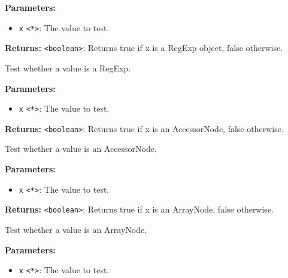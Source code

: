 \documentclass[12pt,a4paper]{article}
\begin{document}
\noindent \textbf{Parameters:}
\begin{itemize}
  \item \texttt{x} \texttt{<*>}: The value to test.
\end{itemize}

\noindent \textbf{Returns:} \texttt{<boolean>}: Returns true if \textasciigrave{}x\textasciigrave{} is a RegExp object, false otherwise.

\noindent Test whether a value is a RegExp.

\vspace{5mm}
\noindent {}


\noindent \textbf{Parameters:}
\begin{itemize}
  \item \texttt{x} \texttt{<*>}: The value to test.
\end{itemize}

\noindent \textbf{Returns:} \texttt{<boolean>}: Returns true if \textasciigrave{}x\textasciigrave{} is an AccessorNode, false otherwise.

\noindent Test whether a value is an AccessorNode.

\vspace{5mm}
\noindent {}


\noindent \textbf{Parameters:}
\begin{itemize}
  \item \texttt{x} \texttt{<*>}: The value to test.
\end{itemize}

\noindent \textbf{Returns:} \texttt{<boolean>}: Returns true if \textasciigrave{}x\textasciigrave{} is an ArrayNode, false otherwise.

\noindent Test whether a value is an ArrayNode.

\vspace{5mm}
\noindent {}


\noindent \textbf{Parameters:}
\begin{itemize}
  \item \texttt{x} \texttt{<*>}: The value to test.
\end{itemize}
\end{document}
